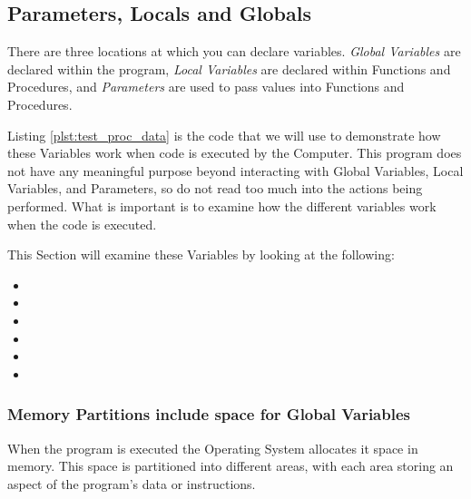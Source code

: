 \clearpage
\subsection{Parameters, Locals and Globals} %
\label{sub:visualise_parameters}

There are three locations at which you can declare variables. \emph{Global Variables} are declared within the program, \emph{Local Variables} are declared within Functions and Procedures, and \emph{Parameters} are used to pass values into Functions and Procedures.


Listing \ref{plst:test_proc_data} is the code that we will use to demonstrate how these Variables work when code is executed by the Computer. This program does not have any meaningful purpose beyond interacting with Global Variables, Local Variables, and Parameters, so do not read too much into the actions being performed. What is important is to examine how the different variables work when the code is executed.

This Section will examine these Variables by looking at the following:
\begin{itemize}
  \item {}
  \item {}
  \item {}
  \item {}
  \item {}
  \item {}
\end{itemize}

\clearpage
\subsubsection{Memory Partitions include space for Global Variables} %
\label{ssub:memory_partitions_include_space_for_global_variables}

When the program is executed the Operating System allocates it space in memory. This space is partitioned into different areas, with each area storing an aspect of the program's data or instructions.

